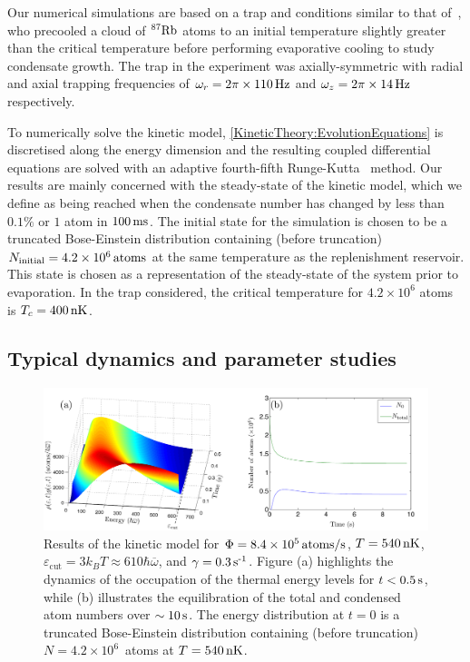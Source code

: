 Our numerical simulations are based on a trap and conditions similar to that of~\citep{Kohl:2002}, who precooled a cloud of $^{87}\text{Rb}$ atoms to an initial temperature slightly greater than the critical temperature before performing evaporative cooling to study condensate growth.  The trap in the experiment was axially-symmetric with radial and axial trapping frequencies of  $\omega_r = \unit[2 \pi \times 110]{Hz}$ and $\omega_z = \unit[2\pi \times 14]{Hz}$ respectively.

To numerically solve the kinetic model, \eqref{KineticTheory:EvolutionEquations} is discretised along the energy dimension and the resulting coupled differential equations are solved with an adaptive fourth-fifth Runge-Kutta~\citep{NumericalRecipes} method. Our results are mainly concerned with the steady-state of the kinetic model, which we define as being reached when the condensate number has changed by less than $0.1\%$ or $1$ atom in $\unit[100]{ms}$.  The initial state for the simulation is chosen to be a truncated Bose-Einstein distribution containing (before truncation) $N_\text{initial} = \unit[4.2\times 10^6]{atoms}$ at the same temperature as the replenishment reservoir.  This state is chosen as a representation of the steady-state of the system prior to evaporation.  In the trap considered, the critical temperature for $4.2\times 10^6$ atoms is $T_c = \unit[400]{nK}$.


\subsection{Typical dynamics and parameter studies}
\label{KineticTheory:ParameterStudies}

\begin{figure}
    \centering
    \includegraphics[width=15cm]{EnergyDistributionFunctionEvolution}
    \caption{Results of the kinetic model for $\Phi = \unit[8.4 \times 10^5]{atoms/s}$, $T=\unit[540]{nK}$, $\varepsilon_\text{cut} = 3 k_B T \approx 610 \hbar \overline{\omega}$, and $\gamma = \unit[0.3]{s\textsuperscript{-1}}$. Figure (a) highlights the dynamics of the occupation of the thermal energy levels for $t < \unit[0.5]{s}$, while (b) illustrates the equilibration of the total and condensed atom numbers over $\sim \unit[10]{s}$. The energy distribution at $t=0$ is a truncated Bose-Einstein distribution containing (before truncation) $N=4.2\times 10^6$~atoms at $T=\unit[540]{nK}$.
    }
    \label{KineticTheory:EnergyDistributionFunctionEvolution}
\end{figure}

